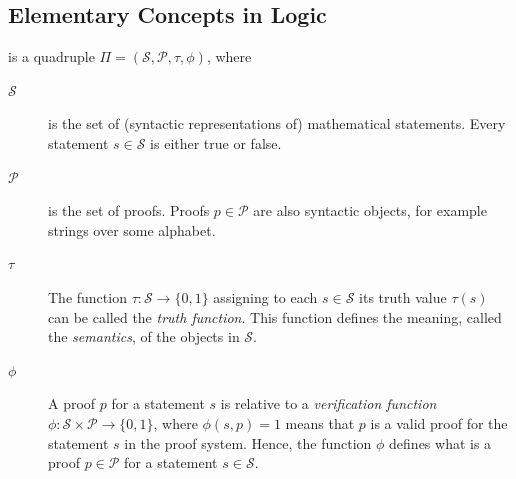 \documentclass[a4paper]{extarticle}
\newcommand{\cS}{\mathcal{S}}
\newcommand{\cP}{\mathcal{P}}
\newcommand{\sep}{\vspace{5pt}\noindent\hrule\vspace{5pt}}
\begin{document}
\begin{multicols*}{2}
\subsection{Elementary Concepts in Logic}

 is a quadruple $\Pi=(\cS,\cP,\tau,\phi)$, where
\begin{description}
\item[$\cS$] is the set of (syntactic representations of) mathematical
statements. Every statement $s\in\cS$ is either true or false.
\item[$\cP$] is the set of proofs. Proofs $p\in\cP$ are also syntactic objects,
for example strings over some alphabet.
\item[$\tau$] The function $\tau\colon\cS\to\{0,1\}$ assigning to each $s\in\cS$
its truth value $\tau(s)$ can be called the \emph{truth function}. This function
defines the meaning, called the \emph{semantics}, of the objects in $\cS$. 

\item[$\phi$] A proof $p$ for a statement $s$ is relative to a
\emph{verification function} $\phi\colon \cS\times\cP \to \{0,1\}$, where
 $\phi(s,p)=1$ means that $p$ is a valid proof for the statement $s$ in the
proof system. Hence, the function $\phi$ defines what is a proof $p\in\cP$ for a
statement $s\in\cS$.
\end{description}


\end{multicols*}
\end{document}
